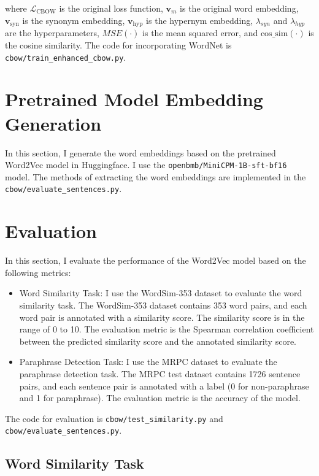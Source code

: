 \documentclass[UTF8,a4paper,12pt]{article}
\newcommand{\V}[1]{\bm{#1}} %
\begin{document}
where $\mathcal{L}_{\text{CBOW}}$ is the original loss function, $\V{v}_m$ is the original word embedding, $\V{v}_{\text{syn}}$ is the synonym embedding, $\V{v}_{\text{hyp}}$ is the hypernym embedding, $\lambda_{syn}$ and $\lambda_{hyp}$ are the hyperparameters, $MSE(\cdot)$ is the mean squared error, and $\text{cos\_sim}(\cdot)$ is the cosine similarity. The code for incorporating WordNet is \texttt{cbow/train\_enhanced\_cbow.py}.

\section{Pretrained Model Embedding Generation}

In this section, I generate the word embeddings based on the pretrained Word2Vec model in Huggingface. I use the \texttt{openbmb/MiniCPM-1B-sft-bf16} model. The methods of extracting the word embeddings are implemented in the \texttt{cbow/evaluate\_sentences.py}.

\section{Evaluation}

In this section, I evaluate the performance of the Word2Vec model based on the following metrics:

\begin{itemize}
    \item Word Similarity Task: I use the WordSim-353 dataset to evaluate the word similarity task. The WordSim-353 dataset contains 353 word pairs, and each word pair is annotated with a similarity score. The similarity score is in the range of 0 to 10. The evaluation metric is the Spearman correlation coefficient between the predicted similarity score and the annotated similarity score.
    \item Paraphrase Detection Task: I use the MRPC dataset to evaluate the paraphrase detection task. The MRPC test dataset contains 1726 sentence pairs, and each sentence pair is annotated with a label (0 for non-paraphrase and 1 for paraphrase). The evaluation metric is the accuracy of the model.
\end{itemize}

The code for evaluation is \texttt{cbow/test\_similarity.py} and \texttt{cbow/evaluate\_sentences.py}.

\subsection{Word Similarity Task}
\end{document}
